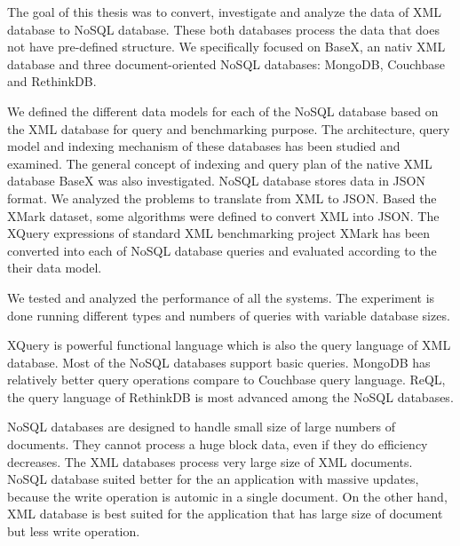 The goal of this thesis was to convert, investigate and analyze the data of XML database to NoSQL database. These both databases  process the data that does not have pre-defined structure. We specifically focused on BaseX, an nativ XML database and three document-oriented NoSQL databases: MongoDB, Couchbase and RethinkDB. 

We defined the different data models for each of the NoSQL database based on the XML database for query and benchmarking purpose. The architecture, query model and indexing mechanism of these databases has been studied and examined. The general concept of indexing and query plan of the native XML database BaseX was also investigated. NoSQL database stores data in JSON format. We analyzed the problems  to translate  from XML to JSON. Based the XMark dataset, some algorithms were defined to convert XML into JSON.
The XQuery expressions of standard XML benchmarking project XMark has been converted into each of NoSQL database queries and evaluated according to the their data model. \par
We tested and analyzed the performance of all the systems. The experiment is done running different types and numbers of queries with variable database sizes. 

XQuery is powerful functional language which is also the query language of XML database. Most of the NoSQL databases support basic queries. MongoDB has relatively better query operations compare to Couchbase query language. ReQL, the query language of RethinkDB is most advanced among the NoSQL databases. 

\par
NoSQL databases are designed to handle small size of large numbers of documents. They cannot process a huge block  data, even if they do efficiency decreases. The XML databases process very large size of XML documents. NoSQL database suited better for the an application with massive updates,  because the write operation is automic in a single document. On the other hand, XML database is best suited for the application that has large size of document but less write operation.






